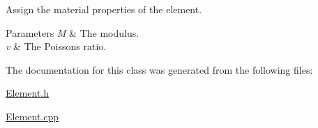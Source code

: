 Assign the material properties of the element. 


\begin{DoxyParams}{Parameters}
{\em M} & The modulus. \\
\hline
{\em v} & The Poisson\textquotesingle{}s ratio. \\
\hline
\end{DoxyParams}


The documentation for this class was generated from the following files\+:\begin{DoxyCompactItemize}
\item 
\mbox{\hyperlink{_element_8h}{Element.\+h}}\item 
\mbox{\hyperlink{_element_8cpp}{Element.\+cpp}}\end{DoxyCompactItemize}
